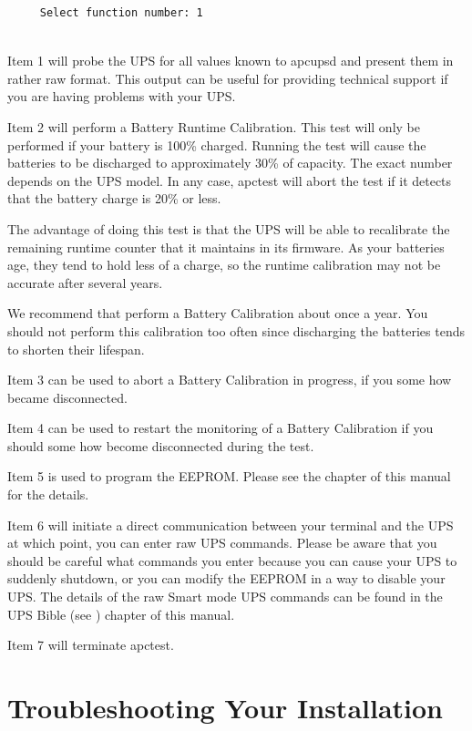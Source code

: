 {{\begin{verbatim}
     Select function number: 1
     
\end{verbatim}
\normalsize

Item 1 will probe the UPS for all values known to apcupsd and present them in
rather raw format. This output can be useful for providing technical support
if you are having problems with your UPS.  

Item 2 will perform a Battery Runtime Calibration. This test will only be
performed if your battery is 100\% charged. Running the test will cause the
batteries to be discharged to approximately 30\% of capacity. The exact number
depends on the UPS model. In any case, apctest will abort the test if it
detects that the battery charge is 20\% or less.  

The advantage of doing this test is that the UPS will be able to recalibrate
the remaining runtime counter that it maintains in its firmware. As your
batteries age, they tend to hold less of a charge, so the runtime calibration
may not be accurate after several years.  

We recommend that perform a Battery Calibration about once a year. You should
not perform this calibration too often since discharging the batteries tends
to shorten their lifespan.  

Item 3 can be used to abort a Battery Calibration in progress, if you some how
became disconnected.  

Item 4 can be used to restart the monitoring of a Battery Calibration if you
should some how become disconnected during the test.  

Item 5 is used to program the EEPROM. Please see the 
 chapter
of this manual for the details.  

Item 6 will initiate a direct communication between your terminal and the UPS
at which point, you can enter raw UPS commands. Please be aware that you
should be careful what commands you enter because you can cause your UPS to
suddenly shutdown, or you can modify the EEPROM in a way to disable your UPS.
The details of the raw Smart mode UPS commands can be found in the UPS Bible
(see 
) chapter of this
manual.  

Item 7 will terminate apctest. 

\label{Troubleshooting-Your-Installation}

\section*{Troubleshooting Your Installation}

}}
